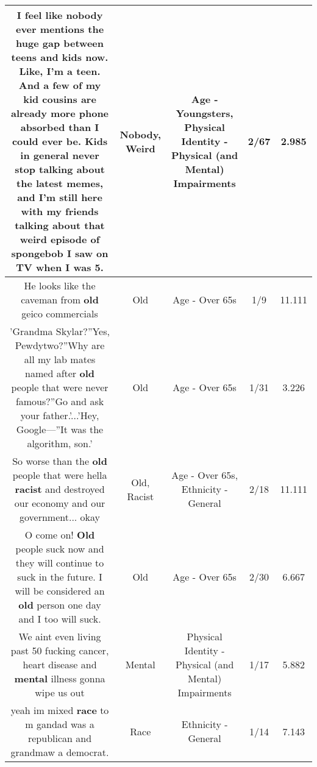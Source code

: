 \documentclass[11pt]{article}
\newlength\mylength
\begin{document}
\begin{center}
\begin{longtable}{|C{.65\mylength}|C{.30\mylength}|C{.12\mylength}|C{.12\mylength}|C{.12\mylength}|}
  \small I feel like \textbf{nobody} ever mentions the huge gap between teens and kids now. Like, I'm a teen. And a few of my kid cousins are already more phone absorbed than I could ever be. Kids in general never stop talking about the latest memes, and I'm still here with my friends talking about that \textbf{weird} episode of spongebob I saw on TV when I was 5.\normalsize   & Nobody, Weird & Age - Youngsters, Physical Identity - Physical (and Mental) Impairments & 2/67 & 2.985 \\  \hline
  \small He looks like the caveman from \textbf{old} geico commercials\normalsize   & Old & Age - Over 65s & 1/9 & 11.111 \\  \hline
  \small 'Grandma Skylar?''Yes, Pewdytwo?''Why are all my lab mates named after \textbf{old} people that were never famous?''Go and ask your father.'...'Hey, Google—''It was the algorithm, son.'\normalsize   & Old & Age - Over 65s & 1/31 & 3.226 \\  \hline
  \small So worse than the \textbf{old} people that were hella \textbf{racist} and destroyed our economy and our government... okay\normalsize   & Old, Racist & Age - Over 65s, Ethnicity - General & 2/18 & 11.111 \\  \hline
  \small O come on! \textbf{Old} people suck now and they will continue to suck in the future. I will be considered an \textbf{old} person one day and I too will suck.\normalsize   & Old & Age - Over 65s & 2/30 & 6.667 \\  \hline
  \small We aint even living past 50 fucking cancer, heart disease and \textbf{mental} illness gonna wipe us out\normalsize   & Mental & Physical Identity - Physical (and Mental) Impairments & 1/17 & 5.882 \\  \hline
  \small yeah im mixed \textbf{race} to m gandad was a republican and grandmaw a democrat.\normalsize   & Race & Ethnicity - General & 1/14 & 7.143 \\  \hline

\end{longtable}
\end{center}
\end{document}
